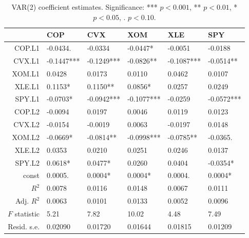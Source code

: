 \begin{table}[ht]
\centering
\caption{VAR(2) coefficient estimates. Significance: *** $p<0.001$, ** $p<0.01$, * $p<0.05$, . $p<0.10$.} 
\label{tab:var_coefs}
\begin{tabular}{rlllll}
  \toprule
 & COP & CVX & XOM & XLE & SPY \\ 
  \midrule
COP.L1 & -0.0434. & -0.0334 & -0.0447* & -0.0051 & -0.0188 \\ 
  CVX.L1 & -0.1447*** & -0.1249*** & -0.0826** & -0.1087*** & -0.0514** \\ 
  XOM.L1 & 0.0428 & 0.0173 & 0.0110 & 0.0462 & 0.0107 \\ 
  XLE.L1 & 0.1153* & 0.1150** & 0.0856* & 0.0257 & 0.0249 \\ 
  SPY.L1 & -0.0703* & -0.0942*** & -0.1077*** & -0.0259 & -0.0572*** \\ 
  COP.L2 & -0.0094 & 0.0197 & 0.0046 & 0.0119 & 0.0123 \\ 
  CVX.L2 & -0.0154 & -0.0019 & 0.0063 & -0.0197 & 0.0148 \\ 
  XOM.L2 & -0.0669* & -0.0814** & -0.0998*** & -0.0785** & -0.0365. \\ 
  XLE.L2 & 0.0353 & 0.0210 & 0.0251 & 0.0246 & 0.0137 \\ 
  SPY.L2 & 0.0618* & 0.0477* & 0.0260 & 0.0404 & -0.0354* \\ 
  const & 0.0005. & 0.0004* & 0.0004* & 0.0004. & 0.0004* \\ 
  $R^2$ & 0.0078 & 0.0116 & 0.0148 & 0.0067 & 0.0111 \\ 
  Adj. $R^2$ & 0.0063 & 0.0101 & 0.0133 & 0.0052 & 0.0096 \\ 
  $F$ statistic & 5.21 & 7.82 & 10.02 & 4.48 & 7.49 \\ 
  Resid. s.e. & 0.02090 & 0.01720 & 0.01644 & 0.01815 & 0.01209 \\ 
   \bottomrule
\end{tabular}
\end{table}

